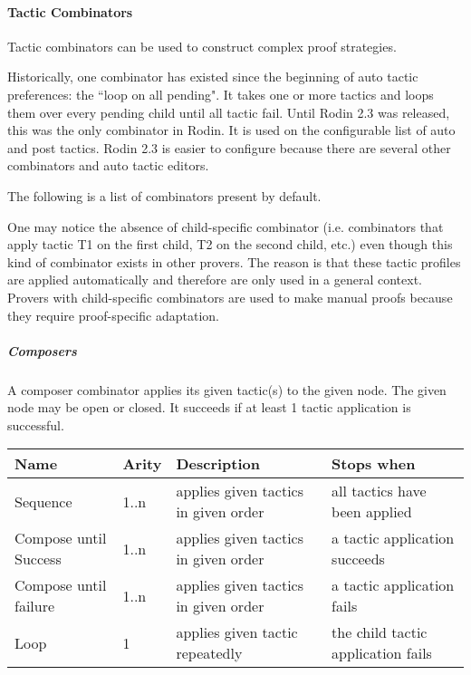 \paragraph{Tactic Combinators}

Tactic combinators can be used to construct complex proof strategies.

Historically, one combinator has existed since the beginning of auto tactic preferences: the ``loop on all pending". It takes one or more tactics and loops them over every pending child until all tactic fail. Until Rodin 2.3 was released, this was the only combinator in Rodin. It is used on the configurable list of auto and post tactics. Rodin 2.3 is easier to configure because there are several other combinators and auto tactic editors.

The following is a list of combinators present by default.

One may notice the absence of child-specific combinator (i.e. combinators that apply tactic T1 on the first child, T2 on the second child, etc.) even though this kind of combinator exists in other provers. The reason is that these tactic profiles are applied automatically and therefore are only used in a general context. Provers with child-specific combinators are used to make manual proofs because they require proof-specific adaptation.

\subparagraph{Composers}

A composer combinator applies its given tactic(s) to the given node. The given node may be open or closed. It succeeds if at least 1 tactic application is successful. 

\begin{center}
    \begin{tabular}{ | p{} | l | p{} | p{} |}
    \hline
	Name & Arity & Description & Stops when  \\ \hline
	Sequence & 1..n  & applies given tactics in given order & all tactics have been applied  \\ \hline
	Compose until Success & 1..n  & applies given tactics in given order & a tactic application succeeds \\ \hline
	Compose until failure  & 1..n  & applies given tactics in given order & a tactic application fails \\ \hline
	Loop & 1 & applies given tactic repeatedly & the child tactic application fails \\ \hline
    \end{tabular}
\end{center}

